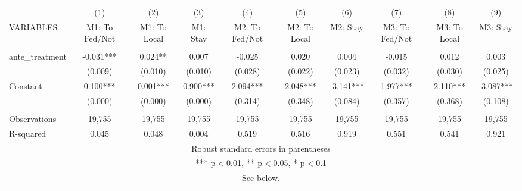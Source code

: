 \begin{tabular}{lccccccccc} \hline
 & (1) & (2) & (3) & (4) & (5) & (6) & (7) & (8) & (9) \\
VARIABLES & M1: To Fed/Not & M1: To Local & M1: Stay & M2: To Fed/Not & M2: To Local & M2: Stay & M3: To Fed/Not & M3: To Local & M3: Stay \\ \hline
 &  &  &  &  &  &  &  &  &  \\
ante\_treatment & -0.031*** & 0.024** & 0.007 & -0.025 & 0.020 & 0.004 & -0.015 & 0.012 & 0.003 \\
 & (0.009) & (0.010) & (0.010) & (0.028) & (0.022) & (0.023) & (0.032) & (0.030) & (0.025) \\
Constant & 0.100*** & 0.001*** & 0.900*** & 2.094*** & 2.048*** & -3.141*** & 1.977*** & 2.110*** & -3.087*** \\
 & (0.000) & (0.000) & (0.000) & (0.314) & (0.348) & (0.084) & (0.357) & (0.368) & (0.108) \\
 &  &  &  &  &  &  &  &  &  \\
Observations & 19,755 & 19,755 & 19,755 & 19,755 & 19,755 & 19,755 & 19,755 & 19,755 & 19,755 \\
 R-squared & 0.045 & 0.048 & 0.004 & 0.519 & 0.516 & 0.919 & 0.551 & 0.541 & 0.921 \\ \hline
\multicolumn{10}{c}{ Robust standard errors in parentheses} \\
\multicolumn{10}{c}{ *** p$<$0.01, ** p$<$0.05, * p$<$0.1} \\
\multicolumn{10}{c}{ See below.} \\
\end{tabular}
